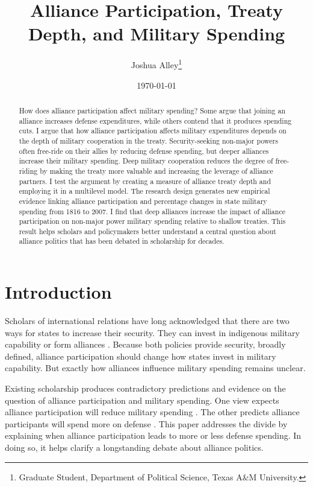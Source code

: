 \documentclass[12pt]{article}
\title{\textbf{Alliance Participation, Treaty Depth, and Military Spending}}
\author{Joshua Alley\footnote{Graduate Student,
Department of Political Science, Texas A\&M University.}}
\date{{\normalsize \today}}
\begin{document}
\maketitle 

\doublespace 

\begin{abstract}
How does alliance participation affect military spending? 
Some argue that joining an alliance increases defense expenditures, while others contend that it produces spending cuts.
I argue that how alliance participation affects military expenditures depends on the depth of military cooperation in the treaty. 
Security-seeking non-major powers often free-ride on their allies by reducing defense spending, but deeper alliances increase their military spending.   
Deep military cooperation reduces the degree of free-riding by making the treaty more valuable and increasing the leverage of alliance partners. 
I test the argument by creating a measure of alliance treaty depth and employing it in a multilevel model. 
The research design generates new empirical evidence linking alliance participation and percentage changes in state military spending from 1816 to 2007. 
I find that deep alliances increase the impact of alliance participation on non-major power military spending relative to shallow treaties.  
This result helps scholars and policymakers better understand a central question about alliance politics that has been debated in scholarship for decades. 
\end{abstract}


 \newpage 


\section{Introduction}


Scholars of international relations have long acknowledged that there are two ways for states to increase their security. 
They can invest in indigenous military capability or form alliances \citep{Morgenthau1948, Altfield1984, Morrow1993}.
Because both policies provide security, broadly defined, alliance participation should change how states invest in military capability. 
But exactly how alliances influence military spending remains unclear. 


Existing scholarship produces contradictory predictions and evidence on the question of alliance participation and military spending. 
One view expects alliance participation will reduce military spending \citep{Morrow1993, Conybeare1994, DigiuseppePoast2016}. 
The other predicts alliance participants will spend more on defense \citep{Diehl1994, MorganPalmer2006}.
This paper addresses the divide by explaining when alliance participation leads to more or less defense spending. 
In doing so, it helps clarify a longstanding debate about alliance politics.
\end{document}
